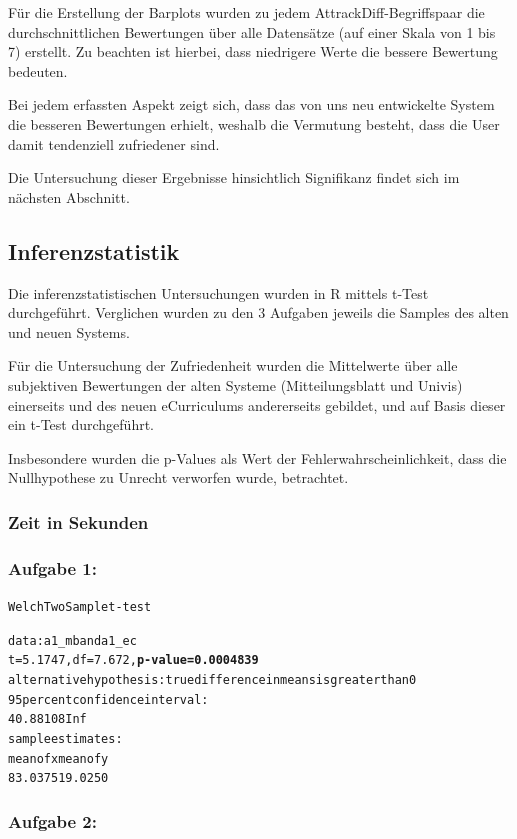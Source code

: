 \documentclass[a4paper,10pt]{scrartcl}
\begin{document}
Für die Erstellung der Barplots wurden zu jedem AttrackDiff-Begriffspaar die durchschnittlichen Bewertungen über alle Datensätze (auf einer Skala von 1 bis 7) erstellt. Zu beachten ist hierbei, dass niedrigere Werte die bessere Bewertung bedeuten.

Bei jedem erfassten Aspekt zeigt sich, dass das von uns neu entwickelte System die besseren Bewertungen erhielt, weshalb die Vermutung besteht, dass die User damit tendenziell zufriedener sind.

Die Untersuchung dieser Ergebnisse hinsichtlich Signifikanz findet sich im nächsten Abschnitt.

\pagebreak

\subsection{Inferenzstatistik}

Die inferenzstatistischen Untersuchungen wurden in R mittels t-Test durchgeführt. Verglichen wurden zu den 3 Aufgaben jeweils die Samples des alten und neuen Systems.

Für die Untersuchung der Zufriedenheit wurden die Mittelwerte über alle subjektiven Bewertungen der alten Systeme (Mitteilungsblatt und Univis) einerseits und des neuen eCurriculums andererseits gebildet, und auf Basis dieser ein t-Test durchgeführt.

Insbesondere wurden die p-Values als Wert der Fehlerwahrscheinlichkeit, dass die Nullhypothese zu Unrecht verworfen wurde, betrachtet.

\subsubsection*{Zeit in Sekunden} 

\subsubsection*{Aufgabe 1:}

\begin{alltt}
Welch Two Sample t-test

data:  a1_mb and a1_ec 
t = 5.1747, df = 7.672, \textbf{p-value = 0.0004839}
alternative hypothesis: true difference in means is greater than 0 
95 percent confidence interval:
 40.88108      Inf 
sample estimates:
mean of x mean of y 
  83.0375   19.0250 
\end{alltt} 

\subsubsection*{Aufgabe 2:}
\end{document}
